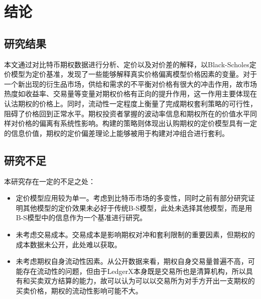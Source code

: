 \chapter{结论}
\section{研究结果}
本文通过对比特币期权数据进行分析、定价以及对价差的解释，以Black-Scholes定价模型为定价基准，发现了一些能够解释真实价格偏离模型价格因素的变量。对于一个新出现的衍生品市场，供给和需求的不平衡对价格有很大的冲击作用，故市场热度如收益率、交易量等变量对期权价格有正向的提升作用，这一作用主要体现在认沽期权的价格上。同时，流动性一定程度上衡量了完成期权套利策略的可行性，阻碍了价格回到正常水平。期权投资者掌握的波动率信息和期权所在的价值水平同样对价格的偏离有系统性影响。构建的策略则体现出认购期权的定价模型具有一定的信息价值，期权的定价偏差理论上能够被用于构建对冲组合进行套利。
\section{研究不足}
本研究存在一定的不足之处：
\begin{itemize}
    \item 定价模型应用较为单一。考虑到比特币市场的多变性，同时之前有部分研究证明其他模型的定价效果未必好于传统B-S模型，此处未选择其他模型，而是用B-S模型中的信息作为一个基准进行研究。
    \item 未考虑交易成本。交易成本是影响期权对冲和套利限制的重要因素，但期权的成本数据未公开，此处难以获取。
    \item 未考虑期权自身流动性因素。从公开数据来看，期权自身交易量普遍不高，可能存在流动性的问题，但由于LedgerX本身既是交易所也是清算机构，所以具有和买卖双方结算的能力，故可以认为可以以交易所为对手方开出一支期权的买卖价格，期权的流动性影响可能不大。
\end{itemize}